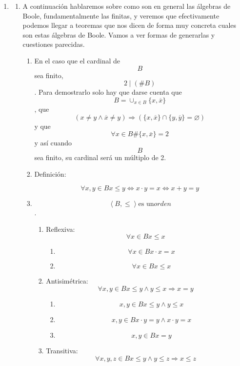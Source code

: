 \begin{enumerate}
\def\labelenumi{\arabic{enumi}.}
\item
  \begin{enumerate}
  \def\labelenumii{\arabic{enumii}.}
  \item
    A continuación hablaremos sobre como son en general las álgebras de
    Boole, funda\-mentalmente las finitas, y veremos que efectivamente
    podemos llegar a teoremas que nos dicen de forma muy concreta cuales
    son estas álgebras de Boole. Vamos a ver for\-mas de generarlas y
    cuestiones parecidas.

    \begin{enumerate}
    \def\labelenumiii{\arabic{enumiii}.}
    \item
      En el caso que el cardinal de \[B\]sea finito,
      \[2 \mid {({\# B})}\]. Para demostrarlo solo hay que darse cuenta
      que \[{B = \cup_{x \in B}}{\{{x,\overline{x}}\}}\], que
      \[{({{x \neq {y \land \overline{x}}} \neq y})}\Rightarrow{({{{\{{x,\overline{x}}\}} \cap {\{{y,\overline{y}}\}}} = \varnothing})}\]
      y que \[\forall{x \in B}\#{{\{{x,\overline{x}}\}} = 2}\] y así
      cuando\[B\]sea finito, su cardinal será un múlti\-plo de 2.
    \item
      Definición:

      \[\forall x,{y \in B}{x \leq y}\Leftrightarrow{{x \cdot y} = x}\Leftrightarrow{{x + y} = y}\]
    \item
      \[\left\langle {B, \leq} \right\rangle\text{es un}\mathit{orden}\].

      \begin{enumerate}
      \def\labelenumiv{\arabic{enumiv}.}
      \item
        Reflexiva: \[\forall{x \in B}{x \leq x}\]

        \begin{enumerate}
        \def\labelenumv{\arabic{enumv}.}
        \tightlist
        \item
          \[\forall{x \in B}{{x \cdot x} = x}\]
        \item
          \[\forall{x \in B}{x \leq x}\]
        \end{enumerate}
      \item
        Antisimétrica:
        \[\forall x,{y \in B}{{x \leq {y \land y}} \leq x}\Rightarrow{x = y}\]

        \begin{enumerate}
        \def\labelenumv{\arabic{enumv}.}
        \tightlist
        \item
          \[x,{y \in B}{{x \leq {y \land y}} \leq x}\]
        \item
          \[x,{y \in B}{{{x \cdot y} = {{y \land x} \cdot y}} = x}\]
        \item
          \[x,{y \in B}{x = y}\]
        \end{enumerate}
      \item
        Transitiva:
        \[\forall x,y,{z \in B}{{x \leq {y \land y}} \leq z}\Rightarrow{x \leq z}\]


\end{enumerate}
\end{enumerate}
\end{enumerate}
\end{enumerate}
